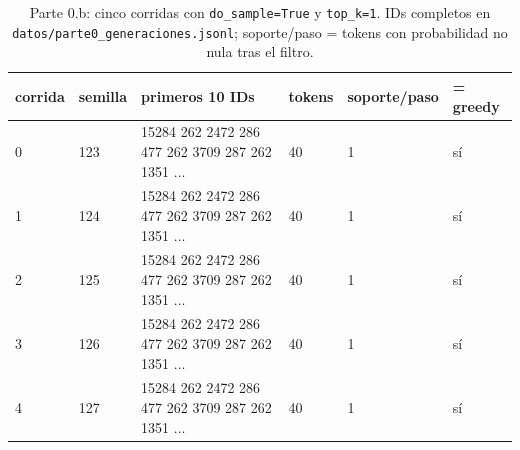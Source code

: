 \begin{table}[H]\centering\caption{Parte 0.b: cinco corridas con \texttt{do\_sample=True} y \texttt{top\_k=1}. IDs completos en \texttt{datos/parte0\_generaciones.jsonl}; soporte/paso = tokens con probabilidad no nula tras el filtro.}\label{tab:p0k1}
{\footnotesize\setlength{\tabcolsep}{3.5pt}
\begin{tabular}{@{}llp{4.6cm}lll@{}}
\hline
corrida & semilla & primeros 10 IDs & tokens & soporte/paso & = greedy \\
\hline
0 & 123 & 15284 262 2472 286 477 262 3709 287 262 1351 ... & 40 & 1 & sí \\
1 & 124 & 15284 262 2472 286 477 262 3709 287 262 1351 ... & 40 & 1 & sí \\
2 & 125 & 15284 262 2472 286 477 262 3709 287 262 1351 ... & 40 & 1 & sí \\
3 & 126 & 15284 262 2472 286 477 262 3709 287 262 1351 ... & 40 & 1 & sí \\
4 & 127 & 15284 262 2472 286 477 262 3709 287 262 1351 ... & 40 & 1 & sí \\
\hline
\end{tabular}
}\end{table}
